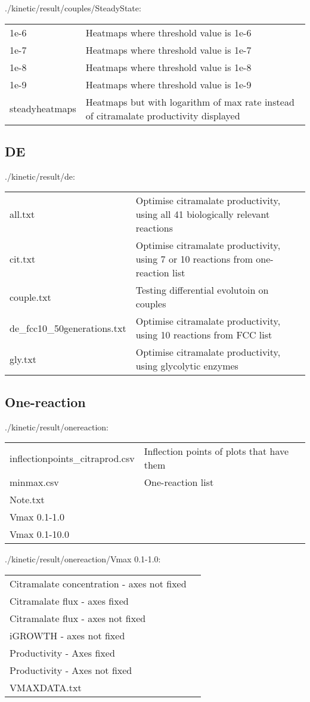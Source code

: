 \documentclass[a4paper, parskip=full]{scrreprt}
\begin{document}
./kinetic/result/couples/SteadyState:

\begin{tabularx}{\linewidth}{LL}
1e-6 & Heatmaps where threshold value is 1e-6\\
1e-7 & Heatmaps where threshold value is 1e-7\\
1e-8 & Heatmaps where threshold value is 1e-8\\
1e-9 & Heatmaps where threshold value is 1e-9\\
steadyheatmaps & Heatmaps but with logarithm of max rate instead of citramalate productivity displayed
\end{tabularx}

\subsection{DE}
\label{ssec:de}

./kinetic/result/de:

\begin{tabularx}{\linewidth}{LL}
all.txt & Optimise citramalate productivity, using all 41 biologically relevant reactions\\
cit.txt & Optimise citramalate productivity, using 7 or 10 reactions from one-reaction list\\
couple.txt & Testing differential evolutoin on couples\\
de\_fcc10\_50generations.txt & Optimise citramalate productivity, using 10 reactions from FCC list\\
gly.txt & Optimise citramalate productivity, using glycolytic enzymes
\end{tabularx}

\subsection{One-reaction}
\label{ssec:onereaction}

./kinetic/result/onereaction:

\begin{tabularx}{\linewidth}{LL}
inflectionpoints\_citraprod.csv & Inflection points of plots that have them\\
minmax.csv & One-reaction list\\
Note.txt\\
Vmax 0.1-1.0\\
Vmax 0.1-10.0\\
\end{tabularx}

./kinetic/result/onereaction/Vmax 0.1-1.0:

\begin{tabularx}{\linewidth}{LL}
Citramalate concentration - axes not fixed\\
Citramalate flux - axes fixed\\
Citramalate flux - axes not fixed\\
iGROWTH - axes not fixed\\
Productivity - Axes fixed\\
Productivity - Axes not fixed\\
VMAXDATA.txt\\
\end{tabularx}
\end{document}
